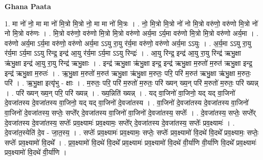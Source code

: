 \documentclass[17pt]{extarticle}
\begin{document}
\textbf{Ghana Paata } \newline

1. मा नो॑ नो॒ मा मा नो॑ मि॒त्रो मि॒त्रो नो॒ मा मा नो॑ मि॒त्रः । . नो॒ मि॒त्रो मि॒त्रो नो॑ नो मि॒त्रो वरु॑णो॒ वरु॑णो मि॒त्रो नो॑ नो मि॒त्रो वरु॑णः । . मि॒त्रो वरु॑णो॒ वरु॑णो मि॒त्रो मि॒त्रो वरु॑णो अर्य॒मा ऽर्य॒मा वरु॑णो मि॒त्रो मि॒त्रो वरु॑णो अर्य॒मा । . वरु॑णो अर्य॒मा ऽर्य॒मा वरु॑णो॒ वरु॑णो अर्य॒मा ऽऽयु रा॒यु र॑र्य॒मा वरु॑णो॒ वरु॑णो अर्य॒मा ऽऽयुः । . अ॒र्य॒मा ऽऽयु रा॒यु र॑र्य॒मा ऽर्य॒मा ऽऽयु रिन्द्र॒ इन्द्र॑ आ॒यु र॑र्य॒मा ऽर्य॒मा ऽऽयु रिन्द्रः॑ । . आ॒यु रिन्द्र॒ इन्द्र॑ आ॒यु रा॒यु रिन्द्र॑ ऋभु॒क्षा ऋ॑भु॒क्षा इन्द्र॑ आ॒यु रा॒यु रिन्द्र॑ ऋभु॒क्षाः । . इन्द्र॑ ऋभु॒क्षा ऋ॑भु॒क्षा इन्द्र॒ इन्द्र॑ ऋभु॒क्षा म॒रुतो॑ म॒रुत॑ ऋभु॒क्षा इन्द्र॒ इन्द्र॑ ऋभु॒क्षा म॒रुतः॑ । . ऋ॒भु॒क्षा म॒रुतो॑ म॒रुत॑ ऋभु॒क्षा ऋ॑भु॒क्षा म॒रुतः॒ परि॒ परि॑ म॒रुत॑ ऋभु॒क्षा ऋ॑भु॒क्षा म॒रुतः॒ परि॑ । . ऋ॒भु॒क्षा इत्यृ॑भु - क्षाः । . म॒रुतः॒ परि॒ परि॑ म॒रुतो॑ म॒रुतः॒ परि॑ ख्यन् ख्य॒न् परि॑ म॒रुतो॑ म॒रुतः॒ परि॑ ख्यन्न् । . परि॑ ख्यन् ख्य॒न् परि॒ परि॑ ख्यन्न् । . ख्य॒न्निति॑ ख्यन्न् । . यद् वा॒जिनो॑ वा॒जिनो॒ यद् यद् वा॒जिनो॑ दे॒वजा॑तस्य दे॒वजा॑तस्य वा॒जिनो॒ यद् यद् वा॒जिनो॑ दे॒वजा॑तस्य । . वा॒जिनो॑ दे॒वजा॑तस्य दे॒वजा॑तस्य वा॒जिनो॑ वा॒जिनो॑ दे॒वजा॑तस्य॒ सप्तेः॒ सप्ते᳚र् दे॒वजा॑तस्य वा॒जिनो॑ वा॒जिनो॑ दे॒वजा॑तस्य॒ सप्तेः᳚ । . दे॒वजा॑तस्य॒ सप्तेः॒ सप्ते᳚र् दे॒वजा॑तस्य दे॒वजा॑तस्य॒ सप्तेः᳚ प्रव॒क्ष्यामः॑ प्रव॒क्ष्यामः॒ सप्ते᳚र् दे॒वजा॑तस्य दे॒वजा॑तस्य॒ सप्तेः᳚ प्रव॒क्ष्यामः॑ । . दे॒वजा॑त॒स्येति॑ दे॒व - जा॒त॒स्य॒ । . सप्तेः᳚ प्रव॒क्ष्यामः॑ प्रव॒क्ष्यामः॒ सप्तेः॒ सप्तेः᳚ प्रव॒क्ष्यामो॑ वि॒दथे॑ वि॒दथे᳚ प्रव॒क्ष्यामः॒ सप्तेः॒ सप्तेः᳚ प्रव॒क्ष्यामो॑ वि॒दथे᳚ । . प्र॒व॒क्ष्यामो॑ वि॒दथे॑ वि॒दथे᳚ प्रव॒क्ष्यामः॑ प्रव॒क्ष्यामो॑ वि॒दथे॑ वी॒र्या॑णि वी॒र्या॑णि वि॒दथे᳚ प्रव॒क्ष्यामः॑ प्रव॒क्ष्यामो॑ वि॒दथे॑ वी॒र्या॑णि । \newline
\end{document}
